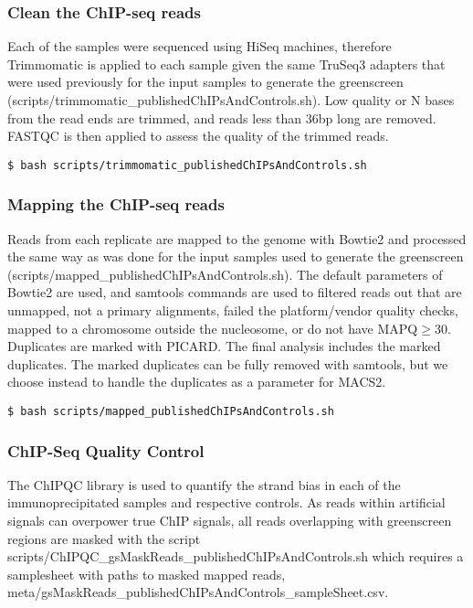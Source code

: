 \documentclass{article}
\begin{document}
\begin{sloppypar}
\subsubsection{Clean the ChIP-seq reads}

Each of the samples were sequenced using HiSeq machines, therefore Trimmomatic is applied to each sample given the same TruSeq3 adapters that were used previously for the input samples to generate the greenscreen ({\selectfont scripts/trimmomatic\_publishedChIPsAndControls.sh}). Low quality or N bases from the read ends are trimmed, and reads less than 36bp long are removed. FASTQC is then applied to assess the quality of the trimmed reads.

\begin{verbatim}
$ bash scripts/trimmomatic_publishedChIPsAndControls.sh
\end{verbatim}

\subsubsection{Mapping the ChIP-seq reads}

Reads from each replicate are mapped to the genome with Bowtie2 and processed the same way as was done for the input samples used to generate the greenscreen ({\selectfont scripts/mapped\_publishedChIPsAndControls.sh}). The default parameters of Bowtie2 are used, and samtools commands are used to filtered reads out that are unmapped, not a primary alignments, failed the platform/vendor quality checks, mapped to a chromosome outside the nucleosome, or do not have MAPQ$\geq$30. Duplicates are marked with PICARD. The final analysis includes the marked duplicates. The marked duplicates can be fully removed with samtools, but we choose instead to handle the duplicates as a parameter for MACS2.

\begin{verbatim}
$ bash scripts/mapped_publishedChIPsAndControls.sh
\end{verbatim}

\subsubsection{ChIP-Seq Quality Control}

The ChIPQC library is used to quantify the strand bias in each of the immunoprecipitated samples and respective controls. As reads within artificial signals can overpower true ChIP signals, all reads overlapping with greenscreen regions are masked with the script {\selectfont scripts/ChIPQC\_gsMaskReads\_publishedChIPsAndControls.sh} which requires a samplesheet with paths to masked mapped reads, {\selectfont meta/gsMaskReads\_publishedChIPsAndControls\_sampleSheet.csv}.


\end{sloppypar}
\end{document}
